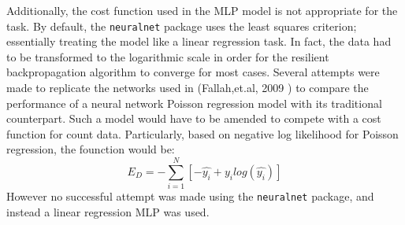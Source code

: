 Additionally, the cost function used in the MLP model is not appropriate for the task.  By default, the \texttt{neuralnet} package uses the least squares criterion; essentially treating the model like a linear regression task.  In fact, the data had to be transformed to the logarithmic scale in order for the resilient backpropagation algorithm to converge for most cases.  Several attempts were made to replicate the networks used in (Fallah,et.al, 2009 \cite{fallah2009nonlinear}) to compare the
performance of a neural network Poisson regression model with its traditional counterpart.  Such a model would have to be amended to compete with a cost function for count data.  Particularly, based on negative log likelihood for Poisson regression, the founction would be:
$$
E_D = - \sum_{i=1}^N \left[ -\hat{y_i} + y_i log(\hat{y_i}) \right]
$$
However no successful attempt was made using the \texttt{neuralnet} package, and instead a linear regression MLP was used.
